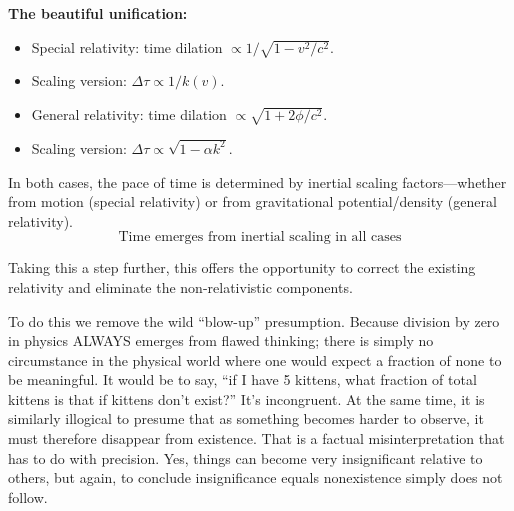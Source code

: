\textbf{The beautiful unification:}
\begin{itemize}[leftmargin=0.5cm]
    \item Special relativity: time dilation $\propto 1/\sqrt{1 - v^2/c^2}$.
    \item Scaling version: $\Delta\tau \propto 1/k(v)$.
    \item General relativity: time dilation $\propto \sqrt{1 + 2\phi/c^2}$.
    \item Scaling version: $\Delta\tau \propto \sqrt{1 - \alpha k^2}$.
\end{itemize}
In both cases, the pace of time is determined by inertial scaling factors---whether from motion (special relativity) or from gravitational potential/density (general relativity).
\[
\boxed{\text{Time emerges from inertial scaling in all cases}}
\]

Taking this a step further, this offers the opportunity to correct the existing relativity and eliminate the non-relativistic components.

To do this we remove the wild ``blow-up'' presumption. Because division by zero in physics ALWAYS emerges from flawed thinking; there is simply no circumstance in the physical world where one would expect a fraction of none to be meaningful. It would be to say, ``if I have 5 kittens, what fraction of total kittens is that if kittens don't exist?'' It's incongruent. At the same time, it is similarly illogical to presume that as something becomes harder to observe, it must therefore disappear from existence. That is a factual misinterpretation that has to do with precision. Yes, things can become very insignificant relative to others, but again, to conclude insignificance equals nonexistence simply does not follow.

